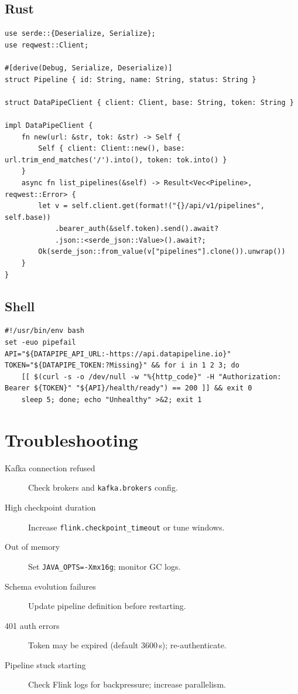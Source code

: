 \documentclass[
    language=english,
    doctype=article,
    institution=none,
]{../../omnilatex}
\begin{document}
\subsection{Rust}

\begin{verbatim}
use serde::{Deserialize, Serialize};
use reqwest::Client;

#[derive(Debug, Serialize, Deserialize)]
struct Pipeline { id: String, name: String, status: String }

struct DataPipeClient { client: Client, base: String, token: String }

impl DataPipeClient {
    fn new(url: &str, tok: &str) -> Self {
        Self { client: Client::new(), base: url.trim_end_matches('/').into(), token: tok.into() }
    }
    async fn list_pipelines(&self) -> Result<Vec<Pipeline>, reqwest::Error> {
        let v = self.client.get(format!("{}/api/v1/pipelines", self.base))
            .bearer_auth(&self.token).send().await?
            .json::<serde_json::Value>().await?;
        Ok(serde_json::from_value(v["pipelines"].clone()).unwrap())
    }
}
\end{verbatim}

\subsection{Shell}

\begin{verbatim}
#!/usr/bin/env bash
set -euo pipefail
API="${DATAPIPE_API_URL:-https://api.datapipeline.io}"
TOKEN="${DATAPIPE_TOKEN:?Missing}" && for i in 1 2 3; do
    [[ $(curl -s -o /dev/null -w "%{http_code}" -H "Authorization: Bearer ${TOKEN}" "${API}/health/ready") == 200 ]] && exit 0
    sleep 5; done; echo "Unhealthy" >&2; exit 1
\end{verbatim}

\section{Troubleshooting}
\label{sec:troubleshooting}

\begin{description}
    \item[Kafka connection refused] Check brokers and \texttt{kafka.brokers} config.
    \item[High checkpoint duration] Increase \texttt{flink.checkpoint\_timeout} or tune windows.
    \item[Out of memory] Set \texttt{JAVA\_OPTS=-Xmx16g}; monitor GC logs.
    \item[Schema evolution failures] Update pipeline definition before restarting.
    \item[401 auth errors] Token may be expired (default 3600\,s); re-authenticate.
    \item[Pipeline stuck starting] Check Flink logs for backpressure; increase parallelism.
\end{description}
\end{document}
